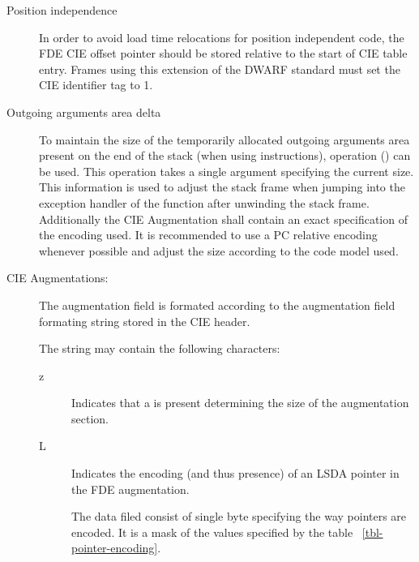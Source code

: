 \begin{description}
\item[Position independence]

  In order to avoid load time relocations for position independent
  code, the FDE CIE offset pointer should be stored relative to the
  start of CIE table entry.  Frames using this extension of the DWARF
  standard must set the CIE identifier tag to 1.

\item[Outgoing arguments area delta]
  
  To maintain the size of the temporarily allocated outgoing arguments
  area present on the end of the stack (when using 
  instructions), operation  () can be
  used.  This operation takes a single  argument
  specifying the current size.  This information is used to adjust the
  stack frame when jumping into the exception handler of the function
  after unwinding the stack frame.  Additionally the CIE Augmentation
  shall contain an exact specification of the encoding used.  It is
  recommended to use a PC relative encoding whenever possible and
  adjust the size according to the code model used.

\item[CIE Augmentations:]
 
  The augmentation field is formated according to the augmentation
  field formating string stored in the CIE header.
  
  The string may contain the following characters:

\begin{description}
\item[z] Indicates that a  is present determining the size of
  the augmentation section.
\item[L] Indicates the encoding (and thus presence) of an LSDA pointer in the FDE augmentation.
  
  The data filed consist of single byte specifying the way pointers
  are encoded.  It is a mask of the values specified by the table~
  \ref{tbl-pointer-encoding}.


\end{description}
\end{description}
